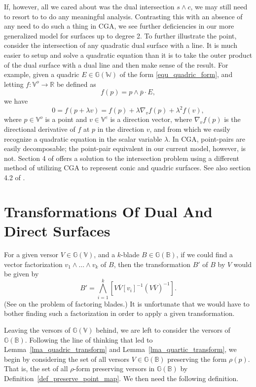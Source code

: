 \documentclass{birkjour}
\theoremstyle{definition}
\theoremstyle{remark}
\numberwithin{equation}{section}
\newcommand{\G}{\mathbb{G}}
\newcommand{\V}{\mathbb{V}}
\newcommand{\W}{\mathbb{W}}
\newcommand{\R}{\mathbb{R}}
\newcommand{\B}{\mathbb{B}}
\begin{document}
If, however, all we cared about was the dual intersection $s\wedge c$, we may still
need to resort to \cite{Wang03} to do any meaningful analysis.
Contrasting this with an absence of any need to do such a thing in CGA,
we see further deficiencies in our more generalized model for surfaces
up to degree 2.
To further illustrate the point, consider the intersection of any quadratic dual surface with a line.
It is much easier to setup and solve a quadratic equation than it is to take the outer
product of the dual surface with a dual line and then make sense of the result.  For example,
given a quadric $E\in\G(\W)$ of the form \eqref{equ_quadric_form}, and
letting $f:\V^o\to\R$ be defined as
\begin{equation}
f(p)=p\wedge\overline{p}\cdot E,
\end{equation}
we have
\begin{equation}
0 = f(p+\lambda v) = f(p)+\lambda \nabla_v f(p)+\lambda^2 f(v),
\end{equation}
where $p\in\V^o$ is a point and $v\in\V^e$ is a direction vector, where
$\nabla_v f(p)$ is the directional derivative of $f$ at $p$ in the direction $v$, and from
which we easily recognize a quadratic equation in the scalar variable $\lambda$.
In CGA, point-pairs are easily decomposable; the point-pair equivalent
in our current model, however, is not.  Section 4 of \cite{Lasenby05} offers
a solution to the intersection problem using a different method of utilizing CGA to
represent conic and quadric surfaces.  See also section 4.2 of \cite{Wareham05}.

\section{Transformations Of Dual And Direct Surfaces}\label{sec_transform_surf}

For a given versor $V\in\G(\V)$,
and a $k$-blade $B\in\G(\B)$, if we could find a vector factorization $v_1\wedge\dots\wedge v_k$
of $B$, then the transformation $B'$ of $B$ by $V$ would be given by
\begin{equation}
B' = \bigwedge_{i=1}^k [V\overline{V}[v_i]^{-1}(V\overline{V})^{-1}].
\end{equation}
(See \cite{Fontijne10} on the problem of factoring blades.)  It is unfortunate that we would
have to bother finding such a factorization in order to apply a given transformation.

Leaving the versors of $\G(\V)$ behind, we are left to consider the versors of $\G(\B)$.
Following the line of thinking that led to Lemma~\ref{lma_quadric_transform} and 
Lemma~\ref{lma_quartic_transform}, we begin by
considering the set of all versors $V\in\G(\B)$ preserving the form $\rho(p)$.
That is, the set of all $\rho$-form preserving versors in $\G(\B)$ by
Definition~\ref{def_preserve_point_map}.
We then need the following definition.
\end{document}

